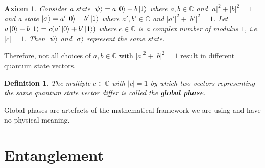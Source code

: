 \documentclass[12pt,twoside,fleqn]{report}
\theoremstyle{thmstyle}
\newtheorem{defn}{Definition}[chapter]
\newtheorem{axiom}{Axiom}[chapter]
\begin{document}
\begin{samepage}
\begin{axiom}
Consider a state $\ket{\psi} = a \ket{0} + b \ket{1}$ where $a,b \in \mathbb{C}$ and $|a|^2 + |b|^2 = 1$ and a state $\ket{\sigma} = a' \ket{0} + b' \ket{1}$ where $a',b' \in \mathbb{C}$ and $|a'|^2 + |b'|^2 = 1$. Let $a \ket{0} + b \ket{1} = c (a' \ket{0} + b' \ket{1})$ where $c \in \mathbb{C}$ is a complex number of modulus $1$, i.e. $|c| = 1$. Then $\ket\psi$ and $\ket\sigma$ represent the same state.
\end{axiom}

Therefore, not all choices of $a, b \in \mathbb{C}$ with $|a|^2 + |b|^2 = 1$ result in different quantum state vectors. 
\begin{defn}
The multiple $c \in \mathbb{C}$ with $|c| = 1$ by which two vectors representing the same quantum state vector differ is called the \textbf{global phase}. 
\end{defn}
Global phases are artefacts of the mathematical framework we are using and have no physical meaning.
\end{samepage}



\pagebreak
\section{Entanglement}

\begin{comment}
x notation for tensor product of vectors
x Simple notation
x properties of tensor product of vectors
* orthonormal basis for tensor product space
* Inner product defined on space of tensor products of vectors
* Definition of tensor product of spaces -- Hilbert space
* Notation for tensor product of spaces
* Tensor product multiplication rules
* Principle of Entanglement
* Proof that most states are entangled
\end{comment}
\end{document}
